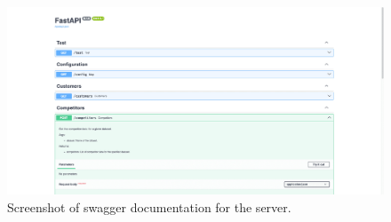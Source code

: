 \begin{figure}[ht]\centering
  \centering
  \includegraphics[width=1\linewidth]{obrazky-figures/ch6/swagger.png}
  \caption{Screenshot of swagger documentation for the server.}
  \label{fig:swagger}
\end{figure}